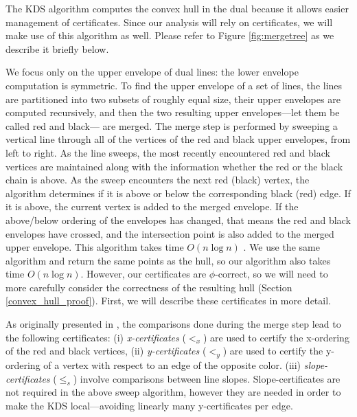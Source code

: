 \documentclass[11pt]{article}
\begin{document}
The KDS algorithm computes the convex hull in the dual because it allows easier management of certificates.
Since our analysis will rely on certificates, we will make use of
this algorithm as well. Please refer to 
Figure \ref{fig:mergetree} as we describe it briefly below. 

We focus only on the upper envelope of dual lines: the lower envelope
computation is symmetric.  To find the upper envelope of a set of
lines, the lines are partitioned into two subsets of roughly equal
size, their upper envelopes are computed recursively, and then the two
resulting upper envelopes---let them be called red and black--- are
merged.  The merge step is performed by sweeping a vertical line
through all of the vertices of the red and black upper envelopes, from
left to right. As the line sweeps, the most recently encountered red
and black vertices are maintained along with the information whether
the red or the black chain is above. As the sweep encounters the next
red (black) vertex, the algorithm determines if it is above or below
the corresponding black (red) edge. If it is above, the current vertex
is added to the merged envelope.  If the above/below ordering of the
envelopes has changed, that means the red and black envelopes have
crossed, and the intersection point is also added to the merged upper
envelope.  This algorithm takes time $O(n \log n)$
\cite{ORourke1998book}.  We use the same algorithm and return the same
points as the hull, so our algorithm also takes time $O(n \log n)$.
However, our certificates are $\phi$-correct, so we will need to more
carefully consider the correctness of the resulting hull (Section
\ref{convex_hull_proof}).  First, we will describe these certificates
in more detail.


As originally presented in \cite{Basch99MobileData}, the comparisons
done during the merge step lead to the following certificates:
(i) \emph{x-certificates} ($<_x$) are used to certify the x-ordering of
the red and black vertices, (ii) \emph{y-certificates} ($<_y$) are
used to certify the y-ordering of a vertex with respect to an edge of
the opposite color. (iii) \emph{slope-certificates} (${\leq}_s$) involve
comparisons between line slopes. Slope-certificates are not required
in the above sweep algorithm, however they are needed in order to make
the KDS local---avoiding linearly many y-certificates per edge.
\end{document}
